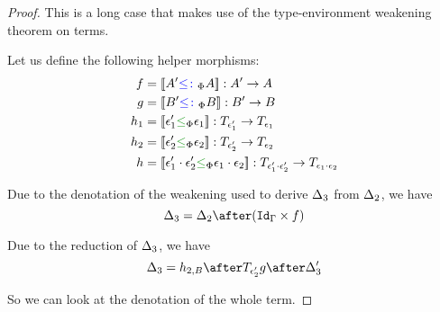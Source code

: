 \documentclass{Report}
\begin{document}
\begin{framed}
\begin{proof}
        \case{\vbind}
    
        This is a long case that makes use of the type-environment weakening theorem on terms.
    
        Let us define the following helper morphisms:
        \begin{align*}
            f & = \deno{A' \subtypep A}: A' \rightarrow A\\
            g & = \deno{B' \subtypep B}: B' \rightarrow B\\
            h_1 & = \deno{\e_1' \subeffectp \e_1} : \T{\e_1'}{} \rightarrow \T{\e_1}{} \\
            h_2 & = \deno{\e_2'\subeffectp \e_2}:\T{\e_2'}{} \rightarrow \T{\e_2}{}\\
            h & = \deno{\e_1'\dot\e_2'\subeffectp\e_1\dot\e_2}: \T{\e_1'\dot\e_2'}{}\rightarrow \T{\e_1\dot\e_2}{}
        \end{align*}
    
        Due to the denotation of the weakening used to derive $\Delta_3$ from $\Delta_2$, we have 
        \begin{equation}
            \D_3 = \D_2\after(\idg\times f)
        \end{equation}
    
        Due to the reduction of $\Delta_3$,
        we have 
        \begin{equation}
            \D_3 = h_{2, B} \after \T{\e_2'}{g}\after \D_3'
        \end{equation}
    
        So we can look at the denotation of the whole term.
    

\end{proof}
\end{framed}
\end{document}
